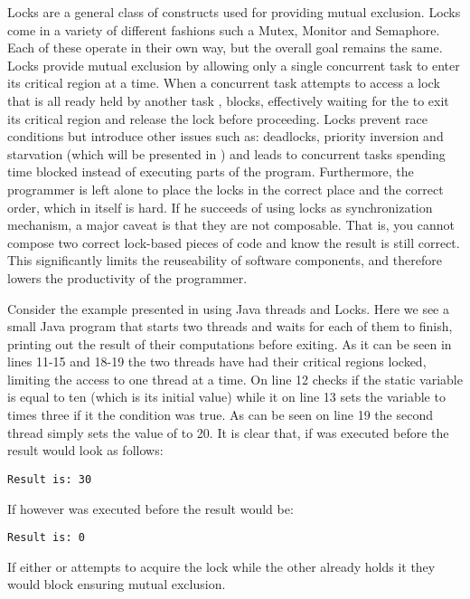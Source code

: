 Locks are a general class of constructs used for providing mutual exclusion. Locks come in a variety of different fashions such a Mutex, Monitor and Semaphore. Each of these operate in their own way, but the overall goal remains the same. Locks provide mutual exclusion by allowing only a single concurrent task to enter its critical region at a time. When a concurrent task  attempts to access a lock that is all ready held by another task , blocks, effectively waiting for the  to exit its critical region and release the lock before proceeding. Locks prevent race conditions but introduce other issues such as: deadlocks, priority inversion and starvation (which will be presented in ) and leads to concurrent tasks spending time blocked instead of executing parts of the program. Furthermore, the programmer is left alone to place the locks in the correct place and the correct order, which in itself is hard. If he succeeds of using locks as synchronization mechanism, a major caveat is that they are not composable\cite[p. 58]{sutter2005software}. That is, you cannot compose two correct lock-based pieces of code and know the result is still correct. This significantly limits the reuseability of software components, and therefore lowers the productivity of the programmer.

Consider the example presented in  using Java threads and Locks. Here we see a small Java program that starts two threads and waits for each of them to finish, printing out the result of their computations before exiting. As it can be seen in lines 11-15 and 18-19 the two threads have had their critical regions locked, limiting the access to one thread at a time. On line 12  checks if the static variable  is equal to ten (which is its initial value) while it on line 13 sets the  variable to  times three if it the condition was true. As can be seen on line 19 the second thread simply sets the value of  to 20. It is clear that, if  was executed before  the result would look as follows:
\begin{verbatim}
Result is: 30
\end{verbatim}
If however  was executed before  the result would be:
\begin{verbatim}
Result is: 0
\end{verbatim}
If either  or  attempts to acquire the lock while the other already holds it they would block ensuring mutual exclusion.

